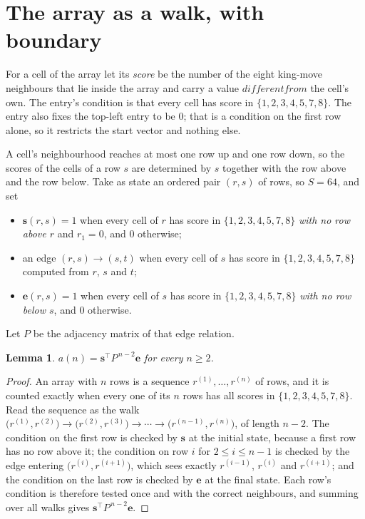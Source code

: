 \documentclass[11pt,a4paper]{article}
\theoremstyle{plain}
\newtheorem{lemma}[theorem]{Lemma}
\theoremstyle{definition}
\begin{document}
\section{The array as a walk, with boundary}

For a cell of the array let its \emph{score} be the number of the eight king-move neighbours that lie inside
the array and carry a value $different from$ the cell's own. The entry's condition is that every cell
has score in $\{1,2,3,4,5,7,8\}$. The entry also fixes the top-left entry to be $0$; that is a condition on the first row alone, so it restricts the start vector and nothing else.

A cell's neighbourhood reaches at most one row up and one row down, so the scores of the
cells of a row $s$ are determined by $s$ together with the row above and the row below.
Take as state an ordered pair $(r,s)$ of rows, so $S=64$, and set
\begin{itemize}
\item $\mathbf{s}(r,s)=1$ when every cell of $r$ has score in $\{1,2,3,4,5,7,8\}$ \emph{with no row
above $r$} and $r_1=0$, and $0$ otherwise;
\item an edge $(r,s)\to(s,t)$ when every cell of $s$ has score in $\{1,2,3,4,5,7,8\}$ computed from
$r$, $s$ and $t$;
\item $\mathbf{e}(r,s)=1$ when every cell of $s$ has score in $\{1,2,3,4,5,7,8\}$ \emph{with no row
below $s$}, and $0$ otherwise.
\end{itemize}
Let $P$ be the adjacency matrix of that edge relation.

\begin{lemma}\label{lem:walk}
$a(n)=\mathbf{s}^{\!\top}P^{\,n-2}\mathbf{e}$ for every $n\ge2$.
\end{lemma}

\begin{proof}
An array with $n$ rows is a sequence $r^{(1)},\dots,r^{(n)}$ of rows, and it is counted
exactly when every one of its $n$ rows has all scores in $\{1,2,3,4,5,7,8\}$. Read the sequence as the
walk $\bigl(r^{(1)},r^{(2)}\bigr)\to\bigl(r^{(2)},r^{(3)}\bigr)\to\cdots\to
\bigl(r^{(n-1)},r^{(n)}\bigr)$, of length $n-2$. The condition on the first row is
checked by $\mathbf{s}$ at the initial state, because a first row has no row above it; the
condition on row $i$ for $2\le i\le n-1$ is checked by the edge entering
$\bigl(r^{(i)},r^{(i+1)}\bigr)$, which sees exactly $r^{(i-1)}$, $r^{(i)}$ and
$r^{(i+1)}$; and the condition on the last row is checked by $\mathbf{e}$ at the final
state. Each row's condition is therefore tested once and with the correct neighbours, and
summing over all walks gives $\mathbf{s}^{\!\top}P^{\,n-2}\mathbf{e}$.
\end{proof}
\end{document}
